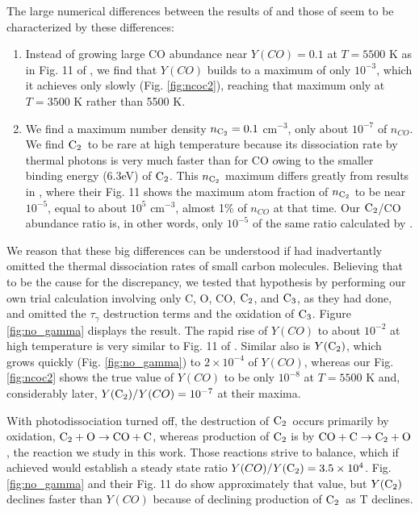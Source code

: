\documentclass[manuscript]{aastex}
\newcommand{\ctwo}{{\rm C}_2}
\newcommand{\cthree}{{\rm C}_3}
\newcommand{\coctoctwo}{${\rm CO} + {\rm C} \to \ctwo + {\rm O}$}
\newcommand{\ctowotococ}{$\ctwo + {\rm O} \to {\rm CO} + {\rm C}$}
\begin{document}
The large numerical differences between the results of
\citet{1999Sci...283.1290C,2001ApJ...562..480C}
and those of \citet{2009ApJ...703..642C,2010ApJ...713....1C}
seem to be characterized by these differences:
\begin{enumerate}

\item Instead of growing large CO abundance near $Y(CO)=0.1$ at $T=5500$ K
as in Fig. 11 of \citet{2009ApJ...703..642C}, we find that $Y(CO)$
builds to a maximum of only $10^{-3}$, which it achieves only slowly
(Fig. \ref{fig:ncoc2}), reaching that maximum only at $T=3500$ K rather
than 5500 K.

\item We find a maximum number density $n_{\ctwo} = 0.1$ cm$^{-3}$,
only about $10^{-7}$ of
$n_{CO}$. We find $\ctwo$\ to be rare at high temperature because its
dissociation rate by thermal photons is very much faster than for CO
owing to the smaller binding energy (6.3eV) of $\ctwo$. This $n_{\ctwo}$
maximum differs greatly from results in \citet{2009ApJ...703..642C},
where their Fig. 11 shows the maximum atom fraction of $n_{\ctwo}$ to be
near $10^{-5}$, equal to about $10^5$ cm$^{-3}$, almost 1\% of
$n_{CO}$ at that time. Our $\ctwo$/CO abundance ratio is,
in other words, only $10^{-5}$ of the same ratio calculated by
\citet{2009ApJ...703..642C}.

\end{enumerate}
We reason that these big differences can be understood if
\citet{2009ApJ...703..642C} had inadvertantly omitted the thermal
dissociation rates of small carbon molecules. Believing that to be the
cause for the discrepancy, we tested that hypothesis by performing our
own trial calculation involving only C, O, CO, $\ctwo$, and $\cthree$,
as they had done,
and omitted the $\tau_\gamma$ destruction terms and the oxidation of $\cthree$.
Figure \ref{fig:no_gamma} displays the result.
The rapid rise of $Y(CO)$ to about $10^{-2}$ at high temperature is very 
similar to Fig. 11 of \citet{2009ApJ...703..642C}.
Similar also is $Y(\ctwo)$,
which grows quickly (Fig. \ref{fig:no_gamma}) to $2 \times 10^{-4}$ of $Y(CO)$,
whereas our Fig. \ref{fig:ncoc2} shows the true value of $Y(CO)$ to be
only $10^{-8}$ at $T=5500$ K and, considerably later,
$Y(\ctwo)/Y(CO) = 10^{-7}$ at their maxima. 

With photodissociation turned off, the destruction of $\ctwo$\ occurs primarily
by oxidation, \ctowotococ, whereas production of $\ctwo$ is by
\coctoctwo, the reaction we study in this work.
Those reactions strive to balance, which if achieved would
establish a steady state
ratio $Y(CO)/Y(\ctwo) = 3.5 \times 10^4$. Fig. \ref{fig:no_gamma}
and their Fig. 11 do show
approximately that value, but $Y(\ctwo)$ declines faster than $Y(CO)$
because of declining production of $\ctwo$\ as T declines.
\end{document}
